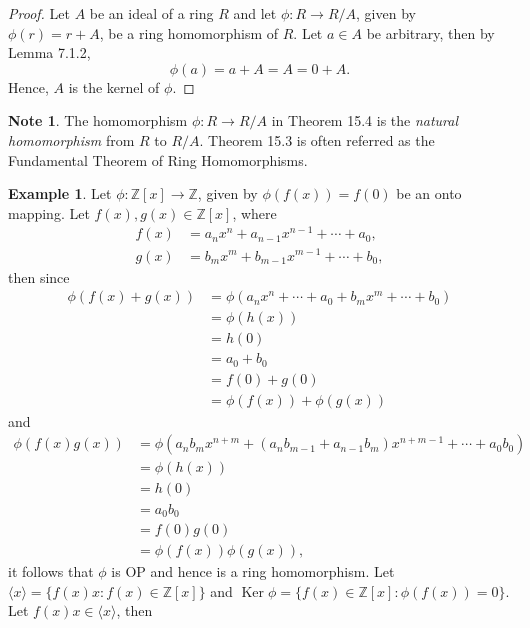 \documentclass{article}
\theoremstyle{definition}
\newtheorem{example}{Example}[section]
\newtheorem{note}{Note}[section]
\DeclareMathOperator{\Ker}{Ker}
\begin{document}
\begin{proof}
     Let $A$ be an ideal of a ring $R$ and let $\phi:R\to R/A$, given by $\phi(r)=r+A$, be a ring homomorphism of $R$. Let $a\in A$ be arbitrary, then by Lemma 7.1.2,
     \begin{equation*}
         \phi(a)=a+A=A=0+A.
     \end{equation*}
     Hence, $A$ is the kernel of $\phi$.
\end{proof}

\begin{note}
    The homomorphism $\phi:R\to R/A$ in Theorem 15.4 is the \textit{natural homomorphism} from $R$ to $R/A$. Theorem 15.3 is often referred as the Fundamental Theorem of Ring Homomorphisms. 
\end{note}

\begin{example}
    Let $\phi:\mathbb{Z}[x]\to\mathbb{Z}$, given by $\phi(f(x))=f(0)$ be an onto mapping. Let $f(x),g(x)\in\mathbb{Z}[x]$, where
    \begin{align*}
        f(x)&=a_nx^n+a_{n-1}x^{n-1}+\cdots+a_0, \\
        g(x)&=b_mx^m+b_{m-1}x^{m-1}+\cdots+b_0,
    \end{align*}
    then since
    \begin{align*}
        \phi(f(x)+g(x))&=\phi(a_nx^n+\cdots+a_0+b_mx^m+\cdots+b_0) \\
        &=\phi(h(x)) \\
        &=h(0) \\
        &=a_0+b_0 \\
        &=f(0)+g(0) \\
        &=\phi(f(x))+\phi(g(x))
    \end{align*}
    and
    \begin{align*}
        \phi(f(x)g(x))&=\phi(a_nb_mx^{n+m}+(a_nb_{m-1}+a_{n-1}b_m)x^{n+m-1}+\cdots+a_0b_0) \\
        &=\phi(h(x)) \\
        &=h(0) \\
        &=a_0b_0 \\
        &=f(0)g(0) \\
        &=\phi(f(x))\phi(g(x)),
    \end{align*}
    it follows that $\phi$ is OP and hence is a ring homomorphism. Let $\langle x \rangle=\{f(x)x:f(x)\in\mathbb{Z}[x]\}$ and $\Ker\phi=\{f(x)\in\mathbb{Z}[x]:\phi(f(x))=0\}$. Let $f(x)x\in\langle x \rangle$, then
    \begin{equation*}

\end{equation*}
\end{example}
\end{document}
